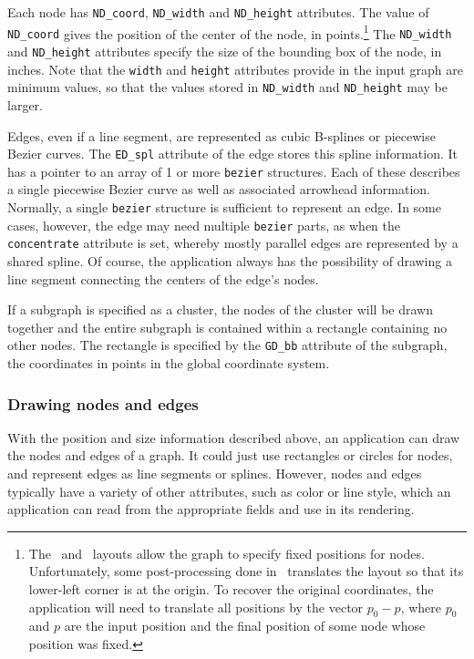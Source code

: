 Each node has {\tt ND\_coord}, {\tt ND\_width} and {\tt ND\_height} 
attributes. The value
of {\tt ND\_coord} gives the position of the center of the node, 
in points.\footnote{
The \neato\ and \fdp\ layouts allow the graph to specify fixed positions
for nodes. Unfortunately, some post-processing done in \gviz\ translates
the layout so that its lower-left corner is at the origin. To recover
the original coordinates, the application will need to translate all positions
by the vector $p_0 - p$, where $p_0$ and $p$ are the input position and
the final position of some node whose position was fixed.
} 
The {\tt ND\_width} and {\tt ND\_height} attributes specify the size of the
bounding box of the node, in inches.
Note that the {\tt width} and {\tt height} attributes provide in the input
graph are minimum values, so that the values stored in {\tt ND\_width} 
and {\tt ND\_height} may be larger.

Edges, even if a line segment, are represented as cubic B-splines or
piecewise Bezier curves.
The {\tt ED\_spl} attribute of the edge stores this spline information.
It has a pointer to an array of 1 or more {\tt bezier} structures. Each
of these describes a single piecewise Bezier curve as well as associated
arrowhead information. Normally, a single {\tt bezier} structure is
sufficient to represent an edge. In some cases, however, 
the edge may need multiple {\tt bezier} parts, as when the {\tt concentrate}
attribute is set, whereby mostly parallel edges are represented by a
shared spline.
Of course, the application always has the possibility of drawing a line
segment connecting the centers of the edge's nodes.

If a subgraph is specified as a cluster, the nodes of the cluster
will be drawn together and the entire subgraph is contained within
a rectangle containing no other nodes. The rectangle is specified by
the {\tt GD\_bb} attribute of the subgraph, the coordinates in points in
the global coordinate system.

\subsubsection{Drawing nodes and edges}
\label{sec:nodes}

With the position and size information described above, an application 
can draw the nodes and edges of a graph. It could just use rectangles 
or circles for nodes, and represent edges as line segments or splines.
However, nodes and edges typically have a variety of other attributes,
such as color or line style, which an application can read from the
appropriate fields and use in its rendering.

